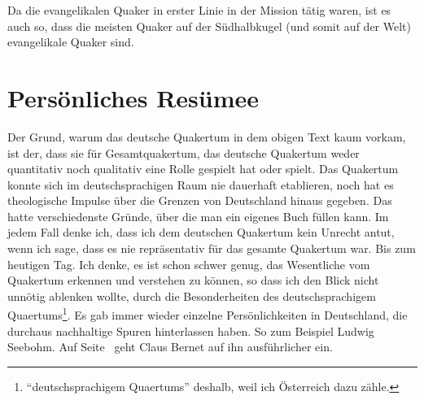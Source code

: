 Da die evangelikalen Quaker in erster Linie in der Mission tätig waren, ist es
auch so, dass die meisten Quaker auf der Südhalbkugel (und somit auf der Welt)
evangelikale Quaker sind.

\section{Persönliches Resümee}

Der Grund, warum das deutsche Quakertum in dem obigen Text kaum vorkam, ist der,
dass sie für Gesamtquakertum, das deutsche Quakertum  weder quantitativ noch
qualitativ eine Rolle gespielt hat oder spielt. Das Quakertum konnte sich im
deutschsprachigen Raum nie dauerhaft etablieren, noch hat es theologische
Impulse
über die Grenzen von Deutschland hinaus gegeben. Das hatte verschiedenste
Gründe, über die man ein eigenes Buch füllen kann.
Im jedem Fall denke ich, dass
ich dem deutschen Quakertum kein Unrecht antut, wenn ich sage, dass es nie
repräsentativ für das gesamte Quakertum war. Bis zum heutigen Tag. Ich denke, es
ist schon schwer genug, das Wesentliche vom Quakertum erkennen und verstehen zu
können, so dass ich den Blick nicht unnötig ablenken wollte, durch die
Besonderheiten des deutschsprachigem Quaertums\footnote{"`deutschsprachigem
Quaertums"' deshalb,
weil ich Österreich dazu zähle.}.
Es gab immer wieder einzelne
Persönlichkeiten in Deutschland, die durchaus nachhaltige Spuren hinterlassen
haben. So
zum Beispiel Ludwig Seebohm. Auf
Seite~\pageref{ref:l_seebohm} geht Claus Bernet
auf ihn ausführlicher ein.

\medskip

